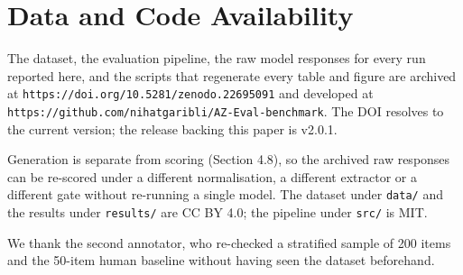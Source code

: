 \documentclass[final]{clv2025}
\begin{document}
\section*{Data and Code Availability}

The dataset, the evaluation pipeline, the raw model responses for every run
reported here, and the scripts that regenerate every table and figure are
archived at \texttt{https://doi.org/10.5281/zenodo.22695091} and developed at
\texttt{https://github.com/nihatgaribli/AZ-Eval-benchmark}. The DOI resolves to
the current version; the release backing this paper is v2.0.1.

Generation is separate from scoring (Section 4.8), so the archived raw
responses can be re-scored under a different normalisation, a different
extractor or a different gate without re-running a single model. The dataset
under \texttt{data/} and the results under \texttt{results/} are CC BY 4.0; the
pipeline under \texttt{src/} is MIT.

\begin{acknowledgments}
We thank the second annotator, who re-checked a stratified sample of 200 items
and the 50-item human baseline without having seen the dataset beforehand.
\end{acknowledgments}



\end{document}
